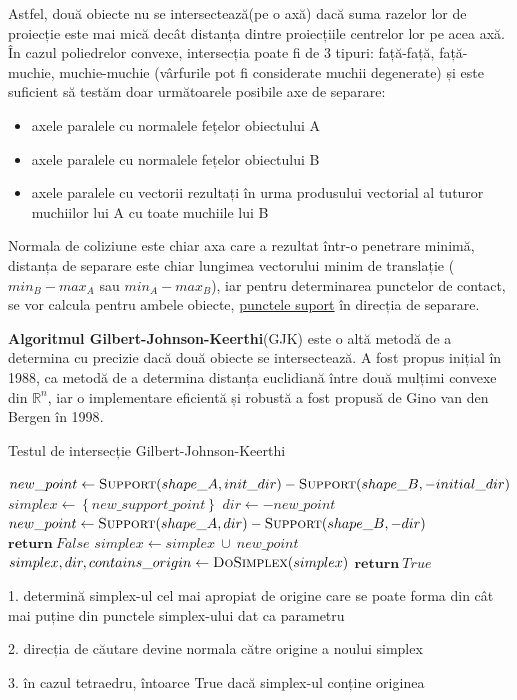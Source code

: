 \documentclass[12pt,a4paper]{report}
\begin{document}
Astfel, două obiecte nu se intersectează(pe o axă) dacă suma razelor lor de proiecție este mai mică decât distanța dintre proiecțiile centrelor lor pe acea axă. În cazul poliedrelor convexe, intersecția poate fi de 3 tipuri: față-față, față-muchie, muchie-muchie (vârfurile pot fi considerate muchii degenerate) și este suficient să testăm doar următoarele posibile axe de separare:
\begin{itemize}
	\item axele paralele cu normalele fețelor obiectului A
	\item axele paralele cu normalele fețelor obiectului B
	\item axele paralele cu vectorii rezultați în urma produsului vectorial al tuturor muchiilor lui A cu toate muchiile lui B
\end{itemize}
Normala de coliziune este chiar axa care a rezultat într-o penetrare minimă, distanța de separare este chiar lungimea vectorului minim de translație ($min_B - max_A$ sau $min_A - max_B$), iar pentru determinarea punctelor de contact, se vor calcula pentru ambele obiecte, \hyperref[support_points]{punctele suport} în direcția de separare.


\textbf{Algoritmul Gilbert-Johnson-Keerthi}(GJK) este o altă metodă de a determina cu precizie dacă două obiecte se intersectează. A fost propus inițial în 1988\cite{gjk_original}, ca metodă de a determina distanța euclidiană între două mulțimi convexe din $\mathbb{R}^n$, iar o implementare eficientă și robustă a fost propusă de Gino van den Bergen în 1998\cite{gjk_gino}.
\begin{algorithm}[H]
	\footnotesize
	\linespread{0.9}\selectfont
	\caption{Testul de intersecție Gilbert-Johnson-Keerthi}
	\label{gjk_intersection_test}
	\begin{algorithmic}[0]
			\State $new\_point \gets \textproc{Support}(shape\_A, init\_dir) - \textproc{Support}(shape\_B, -initial\_dir)$
			\State $simplex \gets \left\lbrace new\_support\_point \right\rbrace $
			\State $dir \gets -new\_point$
			\Loop
				\State $new\_point \gets \textproc{Support}(shape\_A, dir) - \textproc{Support}(shape\_B, -dir)$
					\State $\textbf{return}\ False$
				\EndIf
				\State $simplex \gets simplex\ \cup\ new\_point $
				\State $simplex, dir, contains\_origin \gets \textproc{DoSimplex}(simplex) $
					\State $\textbf{return}\ True$
				\EndIf
			\EndLoop
		\EndFunction
		\Statex
			
			1. determină simplex-ul cel mai apropiat de origine care se poate forma din cât mai puține din punctele simplex-ului dat ca parametru
			
			2. direcția de căutare devine normala către origine a noului simplex
			
			3. în cazul tetraedru, întoarce True dacă simplex-ul conține originea
		\EndFunction
	\end{algorithmic}
\end{algorithm}
\end{document}
